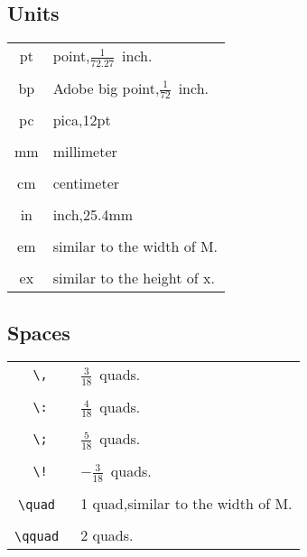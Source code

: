 \documentclass[a4paper]{report}
\begin{document}
\subsection{Units}
\begin{tabular}{c @{\quad} l}

pt & point,$\frac{1}{72.27}$\ inch.\\\\

bp & Adobe big point,$\frac{1}{72}$\ inch.\\\\

pc & pica,12pt\\\\

mm & millimeter\\\\

cm & centimeter\\\\

in & inch,25.4mm\\\\

em & similar to the width of M.\\\\

ex & similar to the height of x.

\end{tabular}


\subsection{Spaces}

\begin{tabular}{c @{\quad} l}

\verb|\,| & $\frac{3}{18}$\ quads.\\\\

\verb|\:| & $\frac{4}{18}$\ quads.\\\\

\verb|\;| & $\frac{5}{18}$\ quads.\\\\

\verb|\!| & $-\frac{3}{18}$\ quads.\\\\

\verb|\quad|\ & 1 quad,similar to the width of M.\\\\

\verb|\qquad|\ & 2 quads.

\end{tabular}
\end{document}
